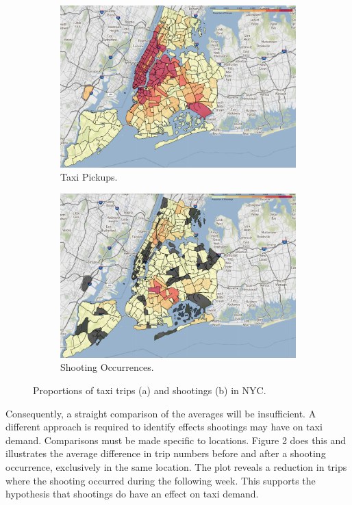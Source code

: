 \documentclass[11pt]{article}
\begin{document}
\begin{figure}[htbp]
    \centering
    \begin{subfigure}[b]{0.48\textwidth}
        \centering
        \includegraphics[width=\textwidth]{GeoVis Taxi.png}
        \caption{Taxi Pickups.}
        \label{fig:taxi}
    \end{subfigure}\hfill
    \begin{subfigure}[b]{0.48\textwidth}
        \centering
        \includegraphics[width=\textwidth]{GeoVis Shooting.png}
        \caption{Shooting Occurrences.}
        \label{fig:shooting}
    \end{subfigure}
    \caption{Proportions of taxi trips (a) and shootings (b) in NYC.}
    \label{fig:both}
\end{figure}

\hspace{0pt}Consequently, a straight comparison of the averages will be insufficient. A different approach is required to identify effects shootings may have on taxi demand. Comparisons must be made specific to locations. Figure 2 does this and illustrates the average difference in trip numbers before and after a shooting occurrence, exclusively in the same location. The plot reveals a reduction in trips where the shooting occurred during the following week. This supports the hypothesis that shootings do have an effect on taxi demand. 
\end{document}
